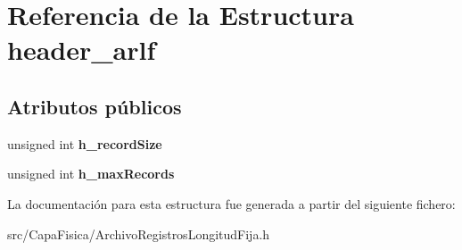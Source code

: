 \hypertarget{structheader__arlf}{\section{\-Referencia de la \-Estructura header\-\_\-arlf}
\label{structheader__arlf}
}
\subsection*{\-Atributos públicos}
\begin{DoxyCompactItemize}
\item 
\hypertarget{structheader__arlf_a887f246980bbb864ef09758cd45f303c}{unsigned int {\bfseries h\-\_\-record\-Size}}\label{structheader__arlf_a887f246980bbb864ef09758cd45f303c}

\item 
\hypertarget{structheader__arlf_aa1c4ee48f074027eaf5a865b602fc738}{unsigned int {\bfseries h\-\_\-max\-Records}}\label{structheader__arlf_aa1c4ee48f074027eaf5a865b602fc738}

\end{DoxyCompactItemize}


\-La documentación para esta estructura fue generada a partir del siguiente fichero\-:\begin{DoxyCompactItemize}
\item 
src/\-Capa\-Fisica/\-Archivo\-Registros\-Longitud\-Fija.\-h\end{DoxyCompactItemize}
